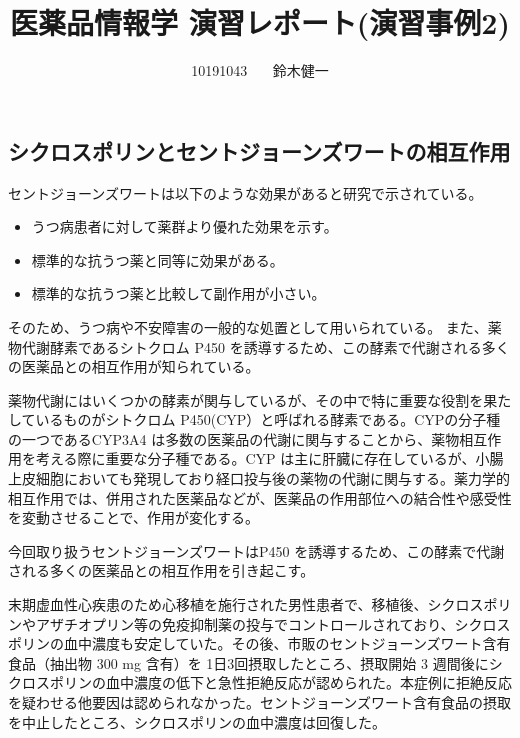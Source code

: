 \documentclass[a4paper,papersize,dvipdfmx]{jsarticle}
\begin{document}
\title{医薬品情報学 演習レポート(演習事例2)}
\author{10191043  \ \ \ 鈴木健一}
\date{}
\maketitle



\subsection*{シクロスポリンとセントジョーンズワートの相互作用}
セントジョーンズワートは以下のような効果があると研究で示されている。
\begin{itemize}
\item うつ病患者に対して薬群より優れた効果を示す。
\item 標準的な抗うつ薬と同等に効果がある。
\item 標準的な抗うつ薬と比較して副作用が小さい。
\end{itemize}

そのため、うつ病や不安障害の一般的な処置として用いられている。
また、薬物代謝酵素であるシトクロム P450 を誘導するため、この酵素で代謝される多くの医薬品との相互作用が知られている。

薬物代謝にはいくつかの酵素が関与しているが、その中で特に重要な役割を果たしているものがシトクロム P450(CYP）と呼ばれる酵素である。CYPの分子種の一つであるCYP3A4 は多数の医薬品の代謝に関与することから、薬物相互作用を考える際に重要な分子種である。CYP は主に肝臓に存在しているが、小腸上皮細胞においても発現しており経口投与後の薬物の代謝に関与する。薬力学的相互作用では、併用された医薬品などが、医薬品の作用部位への結合性や感受性を変動させることで、作用が変化する。

今回取り扱うセントジョーンズワートはP450 を誘導するため、この酵素で代謝される多くの医薬品との相互作用を引き起こす。

\begin{tcolorbox}[colback=white,colbacktitle=black,coltitle=white,title={セントジョーンズワートとシクロスポリンの相互作用の症例}]
末期虚血性心疾患のため心移植を施行された男性患者で、移植後、シクロスポリンやアザチオプリン等の免疫抑制薬の投与でコントロールされており、シクロスポリンの血中濃度も安定していた。その後、市販のセントジョーンズワート含有食品（抽出物 300 mg 含有）を 1日3回摂取したところ、摂取開始 3 週間後にシクロスポリンの血中濃度の低下と急性拒絶反応が認められた。本症例に拒絶反応を疑わせる他要因は認められなかった。セントジョーンズワート含有食品の摂取を中止したところ、シクロスポリンの血中濃度は回復した。
\end{tcolorbox}
\end{document}
